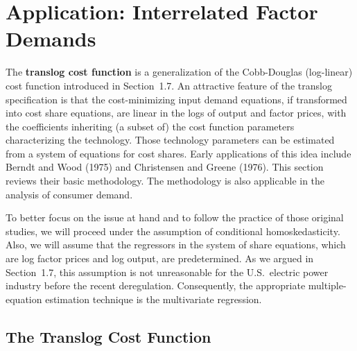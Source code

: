 
\section{Application: Interrelated Factor Demands}
\label{sec:4.7}

The \textbf{translog cost function} is a generalization of the Cobb-Douglas (log-linear)
cost function introduced in Section~1.7. An attractive feature of the translog specification
is that the cost-minimizing input demand equations, if transformed into cost
share equations, are linear in the logs of output and factor prices, with the coefficients
inheriting (a subset of) the cost function parameters characterizing the technology.
Those technology parameters can be estimated from a system of equations
for cost shares. Early applications of this idea include Berndt and Wood (1975)
and Christensen and Greene (1976). This section reviews their basic methodology.
The methodology is also applicable in the analysis of consumer demand.

To better focus on the issue at hand and to follow the practice of those original
studies, we will proceed under the assumption of conditional homoskedasticity.
Also, we will assume that the regressors in the system of share equations, which are
log factor prices and log output, are predetermined. As we argued in Section~1.7,
this assumption is not unreasonable for the U.S.\ electric power industry before the
recent deregulation. Consequently, the appropriate multiple-equation estimation
technique is the multivariate regression.

\subsection*{The Translog Cost Function}

